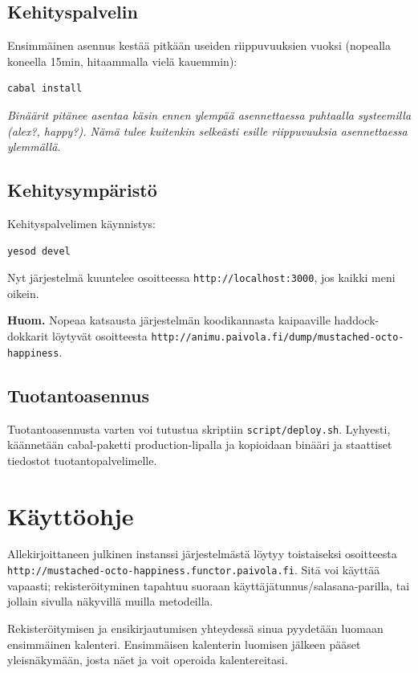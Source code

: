 \documentclass[a4paper,12pt]{report}
\begin{document}
\subsection{Kehityspalvelin}
Ensimmäinen asennus kestää pitkään useiden riippuvuuksien vuoksi (nopealla
koneella 15min, hitaammalla vielä kauemmin):
\begin{verbatim}
cabal install
\end{verbatim}

\textit{Binäärit pitänee asentaa käsin ennen ylempää asennettaessa puhtaalla
systeemilla (alex?, happy?). Nämä tulee kuitenkin selkeästi esille riippuvuuksia
asennettaessa ylemmällä.}

\subsection{Kehitysympäristö}
Kehityspalvelimen käynnistys:
\begin{verbatim}
yesod devel
\end{verbatim}
Nyt järjestelmä kuuntelee osoitteessa \texttt{http://localhost:3000}, jos kaikki
meni oikein.

\textbf{Huom.} Nopeaa katsausta järjestelmän koodikannasta kaipaaville
haddock-dokkarit löytyvät osoitteesta
\texttt{http://animu.paivola.fi/dump/mustached-octo-happiness}.

\subsection{Tuotantoasennus}
Tuotantoasennusta varten voi tutustua skriptiin \texttt{script/deploy.sh}.
Lyhyesti, käännetään cabal-paketti production-lipalla ja kopioidaan binääri ja
staattiset tiedostot tuotantopalvelimelle.

\section{Käyttöohje}
Allekirjoittaneen julkinen instanssi järjestelmästä löytyy toistaiseksi osoitteesta
\\\texttt{http://mustached-octo-happiness.functor.paivola.fi}. Sitä voi käyttää
vapaasti; rekisteröityminen tapahtuu suoraan käyttäjätunnus/salasana-parilla,
tai jollain sivulla näkyvillä muilla metodeilla.

Rekisteröitymisen ja ensikirjautumisen yhteydessä sinua pyydetään luomaan
ensimmäinen kalenteri. Ensimmäisen kalenterin luomisen jälkeen pääset
yleisnäkymään, josta näet ja voit operoida kalentereitasi.
\end{document}
